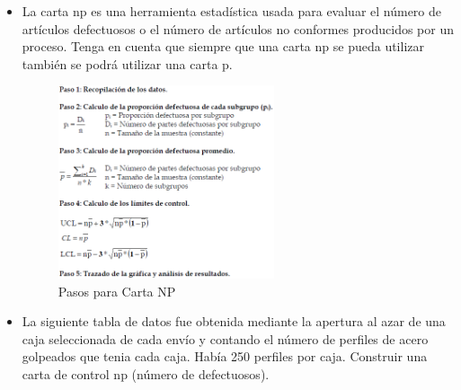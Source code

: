 \documentclass{article}
\theoremstyle{mytheoremstyle}
\theoremstyle{mytheoremstyle}
\theoremstyle{myproblemstyle}
\begin{document}
\begin{itemize}
	\item La carta np es una herramienta estadística usada para evaluar el número de artículos
	defectuosos o el número de artículos no conformes producidos por un proceso. Tenga en cuenta
	que siempre que una carta np se pueda utilizar también se podrá utilizar una carta p.
	\begin{figure}[H]
		\centering
		\includegraphics[width=0.6\textwidth]{CartaNP.png}
		\caption[short]{Pasos para Carta NP}
		\label{fig:imagen2}
	  \end{figure}
	\item La siguiente tabla de datos fue obtenida mediante la apertura al azar de una caja seleccionada
	de cada envío y contando el número de perfiles de acero golpeados que tenia cada caja. Había 250
	perfiles por caja.
	Construir una carta de control np (número de defectuosos).
\end{itemize}
\end{document}
